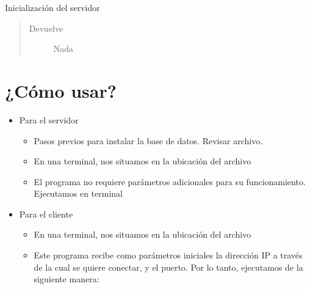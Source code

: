 \documentclass[letterpaper,10pt,spanish,openany,oneside]{sphinxmanual}
\begin{document}

\begin{fulllineitems}
\label{\detokenize{server:server.start_server}}
Inicialización del servidor
\begin{quote}\begin{description}
\item[{Devuelve}] \leavevmode
Nada

\end{description}\end{quote}

\end{fulllineitems}



\chapter{¿Cómo usar?}
\label{\detokenize{index:como-usar}}\begin{itemize}
\item {} 
Para el servidor
\begin{itemize}
\item {} 
Pasos previos para instalar la base de datos. Revisar archivo.

\item {} 
En una terminal, nos situamos en la ubicación del archivo 

\item {} 
El programa no requiere parámetros adicionales para su funcionamiento. Ejecutamos en terminal 

\end{itemize}

\item {} 
Para el cliente
\begin{itemize}
\item {} 
En una terminal, nos situamos en la ubicación del archivo 

\item {} 
Este programa recibe como parámetros iniciales la dirección IP a través de la cual se quiere conectar, y el puerto. Por lo tanto, ejecutamos de la siguiente manera: 

\end{itemize}

\end{itemize}
\end{document}

